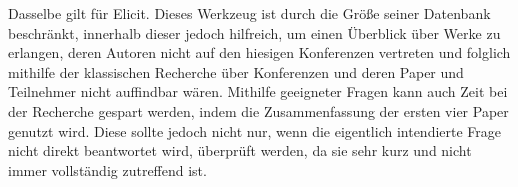 \documentclass[hidelinks,12pt]{report}
\begin{document}
Dasselbe gilt für Elicit. Dieses Werkzeug ist durch die Größe seiner Datenbank beschränkt, innerhalb dieser jedoch hilfreich, um einen Überblick über Werke zu erlangen, deren Autoren nicht auf den hiesigen Konferenzen vertreten und folglich mithilfe der klassischen Recherche über Konferenzen und deren Paper und Teilnehmer nicht auffindbar wären. Mithilfe geeigneter Fragen kann auch Zeit bei der Recherche gespart werden, indem die Zusammenfassung der ersten vier Paper genutzt wird. Diese sollte jedoch nicht nur, wenn die eigentlich intendierte Frage nicht direkt beantwortet wird, überprüft werden, da sie sehr kurz und nicht immer vollständig zutreffend ist.

\endgroup



\end{document}
